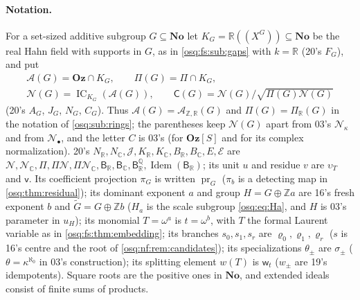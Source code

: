 \documentclass[11pt,letterpaper]{article}
\numberwithin{equation}{section}
\theoremstyle{definition}
\theoremstyle{remark}
\theoremstyle{plain}
\newcommand{\No}{\mathbf{No}}
\newcommand{\Oz}{\mathbf{Oz}}
\newcommand{\Z}{\mathbb Z}
\newcommand{\Q}{\mathbb Q}
\newcommand{\R}{\mathbb R}
\newcommand{\C}{\mathbb C}
\newcommand{\A}{\mathcal A}          %
\newcommand{\NN}{\mathcal N}         %
\newcommand{\hahn}[2]{#1(\!(X^{#2})\!)}
\newcommand{\IC}{\operatorname{IC}}
\newcommand{\Idem}{\operatorname{Idem}}
\begin{document}
\paragraph{Notation.} For a set-sized additive subgroup $G\subseteq\No$ let $K_G=\hahn\R G\subseteq\No$ be the real Hahn field with
supports in $G$, as in \cref{osq:fs:sub:gaps} with $k=\R$ (20's $F_G$), and put
\begin{equation}\label{osq:bb:eq:local}
 \begin{gathered}
 \A(G)=\Oz\cap K_G,\qquad \Pi(G)=\Pi\cap K_G,\\
 \NN(G)=\IC_{K_G}(\A(G)),\qquad \mathsf C(G)=\NN(G)\big/\sqrt{\Pi(G)\NN(G)}
 \end{gathered}
\end{equation}
(20's $A_G$, $J_G$, $N_G$, $C_G$). Thus $\A(G)=\A_{\Z,\R}(G)$ and $\Pi(G)=\Pi_\R(G)$ in the notation of \cref{osq:sub:rings}; the
parentheses keep $\NN(G)$ apart from 03's $\NN_\kappa$ and from $\NN_\bullet$, and the letter $C$ is 03's (for $\Oz[S]$ and for its
complex normalization). 20's $N_\R,N_\C,\mathcal J,K_\R,K_\C,B_\R,B_\C,E,\mathcal E$ are
$\NN,\NN_\C,\Pi,\Pi\NN,\Pi\NN_\C,\mathsf B_\R,\mathsf B_\C,\mathsf B^\Q_\R,\Idem(\mathsf B_\R)$; its unit $u$ and residue $v$ are
$\upsilon_T$ and $\mathsf v$. Its coefficient projection $\pi_G$ is written $\operatorname{pr}_G$ ($\pi_b$ is a detecting map in
\cref{osq:thm:residual}); its dominant exponent $a$ and group $H=G\oplus\Z a$ are 16's fresh exponent $b$ and
$\widetilde G=G\oplus\Z b$ ($H_a$ is the scale subgroup \eqref{osq:eq:Ha}, and $H$ is 03's parameter in $u_H$); its monomial
$T=\omega^a$ is $t=\omega^b$, with $T$ the formal Laurent variable as in \cref{osq:fs:thm:embedding}; its branches $s_0,s_1,s_r$
are $\varrho_0,\varrho_1,\varrho_r$ ($s$ is 16's centre and the root of \cref{osq:nf:rem:candidates}); its specializations
$\theta_\pm$ are $\sigma_\pm$ ($\theta=\kappa^{\aleph_0}$ in 03's construction); its splitting element $w(T)$ is $\mathsf w_t$
($w_\pm$ are 19's idempotents). Square roots are the positive ones in $\No$, and extended ideals consist of finite sums of
products.
\end{document}
